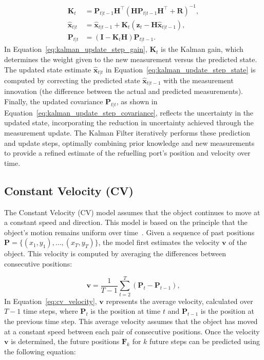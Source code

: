 \documentclass[12pt,oneside]{book} %
\begin{document}
\begin{align}
    \mathbf{K}_t           & = \mathbf{P}_{t|t-1} \mathbf{H}^\top \left(\mathbf{H} \mathbf{P}_{t|t-1} \mathbf{H}^\top + \mathbf{R}\right)^{-1}, \label{eq:kalman_update_step_gain} \\
    \hat{\mathbf{x}}_{t|t} & = \hat{\mathbf{x}}_{t|t-1} + \mathbf{K}_t \left(\mathbf{z}_t - \mathbf{H} \hat{\mathbf{x}}_{t|t-1}\right), \label{eq:kalman_update_step_state}        \\
    \mathbf{P}_{t|t}       & = \left(\mathbf{I} - \mathbf{K}_t \mathbf{H}\right) \mathbf{P}_{t|t-1}. \label{eq:kalman_update_step_covariance}
\end{align}
In Equation~\eqref{eq:kalman_update_step_gain}, $\mathbf{K}_t$ is the Kalman gain, which determines the weight given to the new measurement versus the predicted state. The updated state estimate $\hat{\mathbf{x}}_{t|t}$ in Equation~\eqref{eq:kalman_update_step_state} is computed by correcting the predicted state $\hat{\mathbf{x}}_{t|t-1}$ with the measurement innovation (the difference between the actual and predicted measurements). Finally, the updated covariance $\mathbf{P}_{t|t}$, as shown in Equation~\eqref{eq:kalman_update_step_covariance}, reflects the uncertainty in the updated state, incorporating the reduction in uncertainty achieved through the measurement update.
The Kalman Filter iteratively performs these prediction and update steps,
optimally combining prior knowledge and new measurements to provide a refined
estimate of the refuelling port's position and velocity over time.

\subsection*{Constant Velocity (CV)}
\noindent The Constant Velocity (CV) model assumes that the object continues to move at a constant speed and direction. This model is based on the principle that the object's motion remains uniform over time~\cite{MultipleObjectForecasting}. Given a sequence of past positions $\mathbf{P} = \{(x_1, y_1), \dots, (x_T, y_T)\}$, the model first estimates the velocity $\mathbf{v}$ of the object. This velocity is computed by averaging the differences between consecutive positions:

\begin{equation}
    \mathbf{v} = \frac{1}{T-1} \sum_{t=2}^{T} \left(\mathbf{P}_t - \mathbf{P}_{t-1}\right), \label{eq:cv_velocity}
\end{equation}
In Equation~\eqref{eq:cv_velocity}, $\mathbf{v}$ represents the average velocity, calculated over $T-1$ time steps, where $\mathbf{P}_t$ is the position at time $t$ and $\mathbf{P}_{t-1}$ is the position at the previous time step. This average velocity assumes that the object has moved at a constant speed between each pair of consecutive positions.
Once the velocity $\mathbf{v}$ is determined, the future positions
$\mathbf{F}_{k}$ for $k$ future steps can be predicted using the following
equation:
\end{document}

